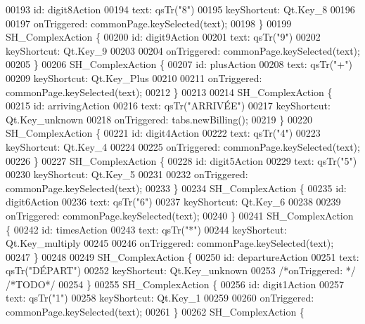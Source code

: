 \begin{DoxyCode}
00193         \textcolor{keywordtype}{id}: digit8Action
00194         text: qsTr(\textcolor{stringliteral}{"8"})
00195         keyShortcut: Qt.Key\_8
00196 
00197         onTriggered: commonPage.keySelected(text);
00198     \}
00199     SH\_ComplexAction \{
00200         \textcolor{keywordtype}{id}: digit9Action
00201         text: qsTr(\textcolor{stringliteral}{"9"})
00202         keyShortcut: Qt.Key\_9
00203 
00204         onTriggered: commonPage.keySelected(text);
00205     \}
00206     SH\_ComplexAction \{
00207         \textcolor{keywordtype}{id}: plusAction
00208         text: qsTr(\textcolor{stringliteral}{"+"})
00209         keyShortcut: Qt.Key\_Plus
00210 
00211         onTriggered: commonPage.keySelected(text);
00212     \}
00213 
00214     SH\_ComplexAction \{
00215         \textcolor{keywordtype}{id}: arrivingAction
00216         text: qsTr(\textcolor{stringliteral}{"ARRIVÉE"})
00217         keyShortcut: Qt.Key\_unknown
00218         onTriggered: tabs.newBilling();
00219     \}
00220     SH\_ComplexAction \{
00221         \textcolor{keywordtype}{id}: digit4Action
00222         text: qsTr(\textcolor{stringliteral}{"4"})
00223         keyShortcut: Qt.Key\_4
00224 
00225         onTriggered: commonPage.keySelected(text);
00226     \}
00227     SH\_ComplexAction \{
00228         \textcolor{keywordtype}{id}: digit5Action
00229         text: qsTr(\textcolor{stringliteral}{"5"})
00230         keyShortcut: Qt.Key\_5
00231 
00232         onTriggered: commonPage.keySelected(text);
00233     \}
00234     SH\_ComplexAction \{
00235         \textcolor{keywordtype}{id}: digit6Action
00236         text: qsTr(\textcolor{stringliteral}{"6"})
00237         keyShortcut: Qt.Key\_6
00238 
00239         onTriggered: commonPage.keySelected(text);
00240     \}
00241     SH\_ComplexAction \{
00242         \textcolor{keywordtype}{id}: timesAction
00243         text: qsTr(\textcolor{stringliteral}{"*"})
00244         keyShortcut: Qt.Key\_multiply
00245 
00246         onTriggered: commonPage.keySelected(text);
00247     \}
00248 
00249     SH\_ComplexAction \{
00250         \textcolor{keywordtype}{id}: departureAction
00251         text: qsTr(\textcolor{stringliteral}{"DÉPART"})
00252         keyShortcut: Qt.Key\_unknown
00253         \textcolor{comment}{/*onTriggered: */} \textcolor{comment}{/*TODO*/}
00254     \}
00255     SH\_ComplexAction \{
00256         \textcolor{keywordtype}{id}: digit1Action
00257         text: qsTr(\textcolor{stringliteral}{"1"})
00258         keyShortcut: Qt.Key\_1
00259 
00260         onTriggered: commonPage.keySelected(text);
00261     \}
00262     SH\_ComplexAction \{

\end{DoxyCode}

